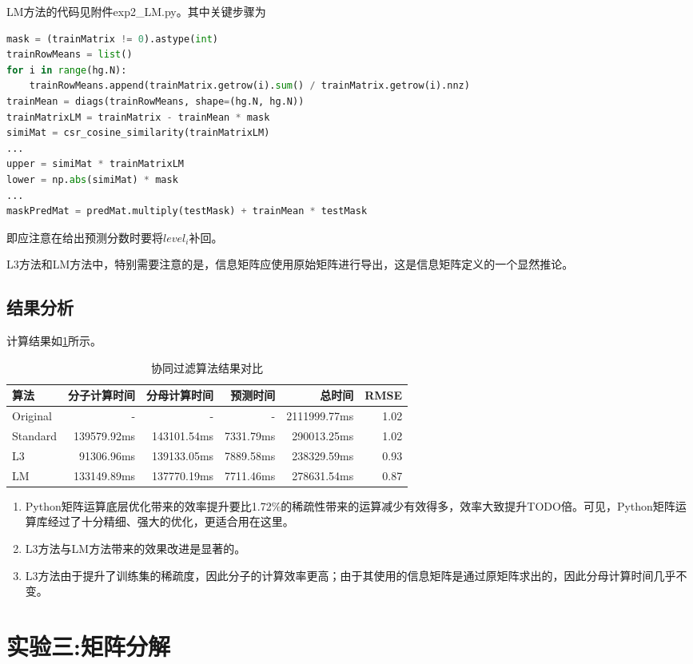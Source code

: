 \documentclass[a4paper,12pt]{article}
\begin{document}
    LM方法的代码见附件exp2\_LM.py。其中关键步骤为
    \begin{lstlisting}[language=python]
mask = (trainMatrix != 0).astype(int)
trainRowMeans = list()
for i in range(hg.N):
    trainRowMeans.append(trainMatrix.getrow(i).sum() / trainMatrix.getrow(i).nnz)
trainMean = diags(trainRowMeans, shape=(hg.N, hg.N))
trainMatrixLM = trainMatrix - trainMean * mask
simiMat = csr_cosine_similarity(trainMatrixLM)
...
upper = simiMat * trainMatrixLM
lower = np.abs(simiMat) * mask
...
maskPredMat = predMat.multiply(testMask) + trainMean * testMask
    \end{lstlisting}
    即应注意在给出预测分数时要将$level_i$补回。

    L3方法和LM方法中，特别需要注意的是，信息矩阵应使用原始矩阵进行导出，这是信息矩阵定义的一个显然推论。
    \subsection{结果分析}
    计算结果如\cref{tbl:exp2}所示。
    \begin{table}
      \centering
      \caption{协同过滤算法结果对比}
      \label{tbl:exp2}
      \begin{tabular}{lrrrrr}
        \toprule
        算法&分子计算时间&分母计算时间&预测时间&总时间&RMSE\\
        \midrule
        Original & - & - & - & 2111999.77ms & 1.02 \\
        Standard & 139579.92ms & 143101.54ms & 7331.79ms & 290013.25ms & 1.02 \\
        L3 & 91306.96ms & 139133.05ms & 7889.58ms & 238329.59ms & 0.93 \\
        LM & 133149.89ms & 137770.19ms & 7711.46ms & 278631.54ms & 0.87 \\
        \bottomrule
      \end{tabular}
    \end{table}
    \begin{enumerate}
      \item Python矩阵运算底层优化带来的效率提升要比1.72\%的稀疏性带来的运算减少有效得多，效率大致提升TODO倍。可见，Python矩阵运算库经过了十分精细、强大的优化，更适合用在这里。
      \item L3方法与LM方法带来的效果改进是显著的。
      \item L3方法由于提升了训练集的稀疏度，因此分子的计算效率更高；由于其使用的信息矩阵是通过原矩阵求出的，因此分母计算时间几乎不变。
    \end{enumerate}
    \section{实验三:矩阵分解}
\end{document}
